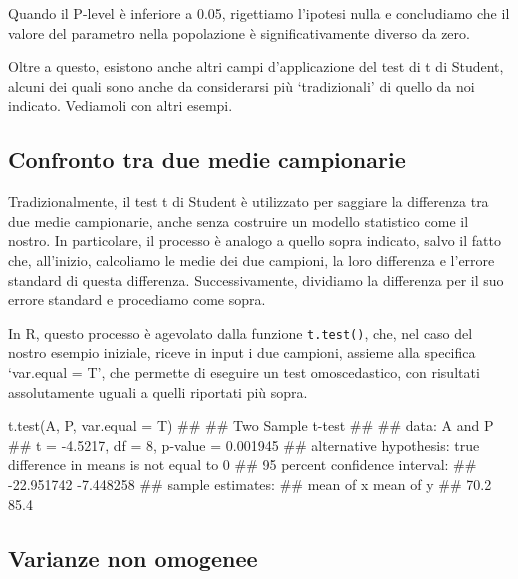 \documentclass[a4paper,12pt,oneside]{book}
\newenvironment{Shaded}{\begin{snugshade}}{\end{snugshade}}
\newcommand{\DocumentationTok}[1]{#1}
\newcommand{\FunctionTok}[1]{#1}
\newcommand{\AttributeTok}[1]{#1}
\newcommand{\NormalTok}[1]{#1}
\begin{document}
Quando il P-level è inferiore a 0.05, rigettiamo l'ipotesi nulla e concludiamo che il valore del parametro nella popolazione è significativamente diverso da zero.

Oltre a questo, esistono anche altri campi d'applicazione del test di t di Student, alcuni dei quali sono anche da considerarsi più `tradizionali' di quello da noi indicato. Vediamoli con altri esempi.

\hypertarget{confronto-tra-due-medie-campionarie}{%
\subsection{Confronto tra due medie campionarie}\label{confronto-tra-due-medie-campionarie}}

Tradizionalmente, il test t di Student è utilizzato per saggiare la differenza tra due medie campionarie, anche senza costruire un modello statistico come il nostro. In particolare, il processo è analogo a quello sopra indicato, salvo il fatto che, all'inizio, calcoliamo le medie dei due campioni, la loro differenza e l'errore standard di questa differenza. Successivamente, dividiamo la differenza per il suo errore standard e procediamo come sopra.

In R, questo processo è agevolato dalla funzione \texttt{t.test()}, che, nel caso del nostro esempio iniziale, riceve in input i due campioni, assieme alla specifica `var.equal = T', che permette di eseguire un test omoscedastico, con risultati assolutamente uguali a quelli riportati più sopra.

\begin{Shaded}
\begin{Highlighting}[]
\FunctionTok{t.test}\NormalTok{(A, P, }\AttributeTok{var.equal =}\NormalTok{ T)}
\DocumentationTok{\#\# }
\DocumentationTok{\#\#  Two Sample t{-}test}
\DocumentationTok{\#\# }
\DocumentationTok{\#\# data:  A and P}
\DocumentationTok{\#\# t = {-}4.5217, df = 8, p{-}value = 0.001945}
\DocumentationTok{\#\# alternative hypothesis: true difference in means is not equal to 0}
\DocumentationTok{\#\# 95 percent confidence interval:}
\DocumentationTok{\#\#  {-}22.951742  {-}7.448258}
\DocumentationTok{\#\# sample estimates:}
\DocumentationTok{\#\# mean of x mean of y }
\DocumentationTok{\#\#      70.2      85.4}
\end{Highlighting}
\end{Shaded}

\hypertarget{varianze-non-omogenee}{%
\subsection{Varianze non omogenee}\label{varianze-non-omogenee}}
\end{document}
